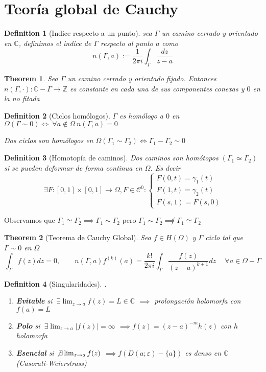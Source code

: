 \documentclass[leqno]{article}
\newtheorem*{definition}{Definition}
\newtheorem*{theorem}{Theorem}
\begin{document}
\section{Teoría global de Cauchy}
\begin{definition}[Indice respecto a un punto] sea $\Gamma$ un camino cerrado y orientado en $\mathbb{C}$, definimos el indice de $\Gamma$ respecto al punto $a$ como
  \[
  n(\Gamma, a) := \frac{1}{2\pi i} \int_{\Gamma} \frac{dz}{z-a}
  \] 
\end{definition}

\begin{theorem}
Sea $\Gamma$ un camino cerrado y orientado fijado. Entonces $n(\Gamma, \cdot): \mathbb{C}-\Gamma \to \mathbb{Z}$
es constante en cada una de sus componentes conexas y $0$ en la no fitada
\end{theorem}

\begin{definition}[Ciclos homólogos]
$\Gamma$ es homólogo a $0$ en $\Omega (\Gamma \sim 0) \iff \ \forall a \not\in \Omega \ n(\Gamma, a) = 0$ 

Dos ciclos son homólogos en $\Omega (\Gamma_1 \sim \Gamma_2) \iff \Gamma_1-\Gamma_2 \sim 0$ 
\end{definition}

\begin{definition}[Homotopía de caminos]
Dos caminos son homótopos $(\Gamma_1 \simeq \Gamma_2)$ si se pueden deformar de forma continua en $\Omega$. Es decir
\[
\ \exists F: [0, 1]\times [0, 1] \to \Omega, F\in \mathcal{C}^0 : \begin{cases}
  F(0, t) = \gamma_1(t) \\
  F(1, t) = \gamma_2(t) \\
  F(s, 1) = F(s, 0)
\end{cases}
\] 
\end{definition}

Observamos que $\Gamma_1 \simeq \Gamma_2 \implies \Gamma_1 \sim \Gamma_2$ pero $\Gamma_1 \sim \Gamma_2 \not\implies \Gamma_1 \simeq \Gamma_2$


\begin{theorem}[Teorema de Cauchy Global]
Sea $f\in H(\Omega)$ y $\Gamma$ ciclo tal que $\Gamma \sim 0$ en $\Omega$
\[
\int_\Gamma f(z)dz = 0, \qquad n(\Gamma, a)f^{(k)}(a) = \frac{k!}{2\pi i}\int_\Gamma \frac{f(z)}{(z-a)^{k+1}}dz  \quad \ \forall a\in \Omega-\Gamma
\] 
\end{theorem}

\begin{definition}[Singularidades] .
\begin{enumerate}[topsep=-6pt, itemsep=0pt]
  \item \textbf{Evitable} si $\ \exists \lim_{z\to a}f(z)=L\in \mathbb{C}$ $\implies$ prolongación holomorfa con $f(a) = L$ 
  \item \textbf{Polo} si $\ \exists \lim_{z\to a}|f(z)|=\infty$ $\implies f(z) = (z-a)^{-m}h(z)$ con $h$ holomorfa
  \item \textbf{Esencial} si $\not \exists \lim_{z\to a}f(z)$ $\implies f(D(a;\varepsilon )-\{a\})$ es denso en $\mathbb{C}$ (Casorati-Weierstrass)
\end{enumerate}
\end{definition}
\end{document}
